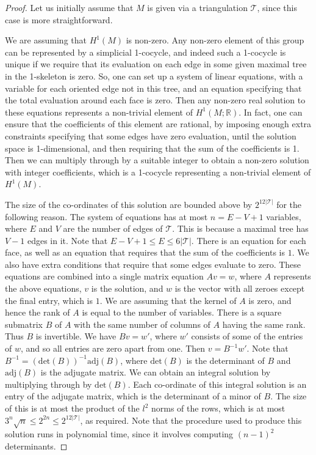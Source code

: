 \documentclass[oneside]{amsart}
\numberwithin{equation}{section}
\theoremstyle{plain}
\theoremstyle{definition}
\newcommand{\calT}{{\mathcal{T}}}
\begin{document}
\begin{proof}
Let us initially assume that $M$ is given via a triangulation $\calT$, since this case is more straightforward.

We are assuming that $H^1(M)$ is non-zero. Any non-zero element of this group can be represented by a simplicial 1-cocycle, and indeed such a 1-cocycle is unique if we require that its evaluation on each edge in some given maximal tree in the 1-skeleton is zero. So, one can set up a system of linear equations, with a variable for each oriented edge not in this tree, and an equation specifying that the total evaluation around each face is zero. Then any non-zero real solution to these equations represents a non-trivial element of $H^1(M; \mathbb{R})$. In fact, one can ensure that the coefficients of this element are rational, by imposing enough extra constraints specifying that some edges have zero evaluation, until the solution space is 1-dimensional, and then requiring that the sum of the coefficients is 1. Then we can multiply through by  a suitable integer to obtain a non-zero solution with integer coefficients, which is a 1-cocycle representing a non-trivial element of $H^1(M)$. 

The size of the co-ordinates of this solution are bounded above by $2^{12|\calT|}$ for the following reason. The system of equations has at most $n = E - V + 1$ variables, where $E$ and $V$ are the number of edges of $\calT$. This is because a maximal tree has $V - 1$ edges in it. Note that $E - V + 1 \leq E \leq 6|\calT|$. There is an equation for each face, as well as an equation that requires that the sum of the coefficients is $1$. We also have extra conditions that require that some edges evaluate to zero. These equations are combined into a single matrix equation $Av = w$, where $A$ represents the above equations, $v$ is the solution, and $w$ is the vector with all zeroes except the final entry, which is $1$. We are assuming that the kernel of $A$ is zero, and hence the rank of $A$ is equal to the number of variables. There is a square submatrix $B$ of $A$ with the same number of columns of $A$ having the same rank. Thus $B$ is invertible. We have $Bv = w'$, where $w'$ consists of some of the entries of $w$, and so all entries are zero apart from one. Then $v = B^{-1}w'$. Note that $B^{-1} = (\mathrm{det}(B))^{-1} \mathrm{adj}(B)$, where $\mathrm{det}(B)$ is the determinant of $B$ and $\mathrm{adj}(B)$ is the adjugate matrix. We can obtain an integral solution by multiplying through by $\mathrm{det}(B)$. Each co-ordinate of this integral solution is an entry of the adjugate matrix, which is the determinant of a minor of $B$. The size of this is at most the product of the $l^2$ norms of the rows, which is at most $3^n \sqrt{n} \leq 2^{2n} \leq 2^{12|\calT|}$, as required. Note that the procedure used to produce this solution runs in polynomial time, since it involves computing $(n-1)^2$ determinants.


\end{proof}
\end{document}
